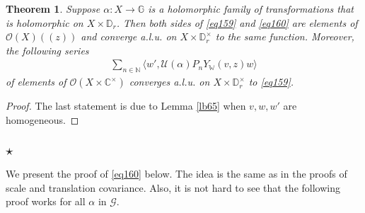 \documentclass[12pt,a4paper,notitlepage]{article}
\theoremstyle{definition}
\theoremstyle{plain}
\newtheorem{thm}[df]{Theorem}
\newcommand{\mc}{\mathcal}
\newcommand{\bk}[1]{\langle {#1}\rangle}
\newcommand{\scr}{\mathscr}
\newcommand{\Wbb}{\mathbb W}
\newcommand{\Gbb}{\mathbb G}
\newcommand{\Cbb}{\mathbb C}
\newcommand{\Nbb}{\mathbb N}
\newcommand{\Dbb}{\mathbb D}
\numberwithin{equation}{section}
\begin{document}
\begin{thm}\label{lb95}
Suppose $\alpha:X\rightarrow\Gbb$ is a holomorphic family of transformations that is holomorphic on $X\times\Dbb_r$. Then both sides of \eqref{eq159} and \eqref{eq160} are elements of $\scr O(X)((z))$ and converge a.l.u. on $X\times\Dbb_r^\times$ to the same function. Moreover, the following series 
\begin{align}
\sum_{n\in\Nbb}\bk{w',\mc U(\alpha)P_nY_\Wbb(v,z)w}	
\end{align}
of elements of $\scr O(X\times\Cbb^{\times})$ converges a.l.u. on $X\times\Dbb_r^\times$ to \eqref{eq159}.
\end{thm}

\begin{proof}
The last statement is due to Lemma \ref{lb65} when $v,w,w'$ are homogeneous.
\end{proof}





\subsection{$\star$}

We present the proof of \eqref{eq160} below. The idea is the same as in the proofs of scale and translation covariance. Also, it is not hard to see that the following proof works for all $\alpha$ in $\mc G$.
\end{document}
